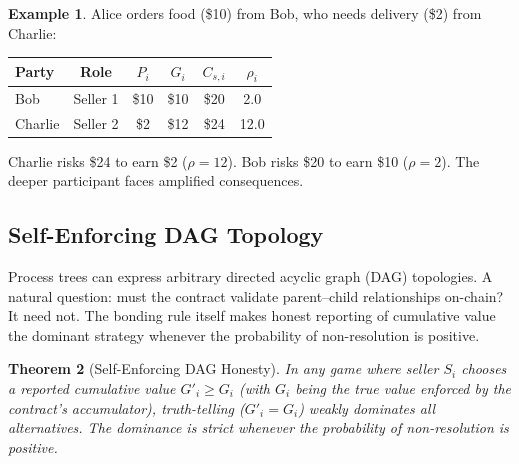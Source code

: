 \documentclass[11pt,a4paper]{article}
\newtheorem{theorem}{Theorem}[section]
\theoremstyle{definition}
\newtheorem{example}[theorem]{Example}
\theoremstyle{remark}
\newcommand{\pay}{P}           %
\newcommand{\cumval}{G}        %
\begin{document}
\begin{example}
\label{ex:food-delivery}
Alice orders food (\$10) from Bob, who needs delivery (\$2) from
Charlie:
\begin{center}
\begin{tabular}{lccccc}
\toprule
Party & Role & $\pay_i$ & $\cumval_i$ & $C_{s,i}$ & $\rho_i$ \\
\midrule
Bob     & Seller 1 & \$10 & \$10 & \$20 & 2.0 \\
Charlie & Seller 2 & \$2  & \$12 & \$24 & 12.0 \\
\bottomrule
\end{tabular}
\end{center}
Charlie risks \$24 to earn \$2 ($\rho = 12$). Bob risks \$20 to earn
\$10 ($\rho = 2$). The deeper participant faces amplified consequences.
\end{example}

\subsection{Self-Enforcing DAG Topology}
\label{sec:self-enforcing-dag}

Process trees can express arbitrary directed acyclic graph (DAG)
topologies. A natural question: must the contract validate parent--child
relationships on-chain? It need not. The bonding rule itself makes
honest reporting of cumulative value the dominant strategy whenever
the probability of non-resolution is positive.

\begin{theorem}[Self-Enforcing DAG Honesty]
\label{thm:self-enforcing-dag}
In any game where seller $S_i$ chooses a reported cumulative value
$\cumval'_i \geq \cumval_i$ (with $\cumval_i$ being the true value
enforced by the contract's accumulator), truth-telling
($\cumval'_i = \cumval_i$) weakly dominates all alternatives. The
dominance is strict whenever the probability of non-resolution is
positive.
\end{theorem}
\end{document}
